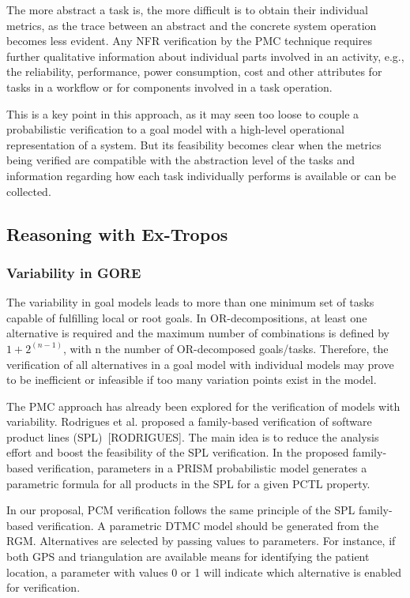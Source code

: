 The more abstract a task is, the more difficult is to obtain their individual metrics, as the trace between an abstract and the concrete system operation becomes less evident. Any NFR verification by the PMC technique requires further qualitative information about individual parts involved in an activity, e.g., the reliability, performance, power consumption, cost and other attributes for tasks in a workflow or for components involved in a task operation.

This is a key point in this approach, as it may seen too loose to couple a probabilistic verification to a goal model with a high-level operational representation of a system. But its feasibility becomes clear when the metrics being verified are compatible with the abstraction level of the tasks and information regarding how each task individually performs is available or can be collected.

\subsection{Reasoning with Ex-Tropos}

\subsubsection{Variability in GORE}

The variability in goal models leads to more than one minimum set of tasks capable of fulfilling local or root goals. In OR-decompositions, at least one alternative is required and the maximum number of combinations is defined by $1 + 2^{(n-1)}$, with n the number of OR-decomposed goals/tasks. Therefore, the verification of all alternatives in a goal model with individual models may prove to be inefficient or infeasible if too many variation points exist in the model.

The PMC approach has already been explored for the verification of models with variability. Rodrigues et al. proposed a family-based verification of software product lines (SPL)~[RODRIGUES]. The main idea is to reduce the analysis effort and boost the feasibility of the SPL verification. In the proposed family-based verification, parameters in a PRISM probabilistic model generates a parametric formula for all products in the SPL for a given PCTL property. 

In our proposal, PCM verification follows the same principle of the SPL family-based verification. A parametric DTMC model should be generated from the RGM. Alternatives are selected by passing values to parameters. For instance, if both GPS and triangulation are available means for identifying the patient location, a parameter with values 0 or 1 will indicate which alternative is enabled for verification. 

